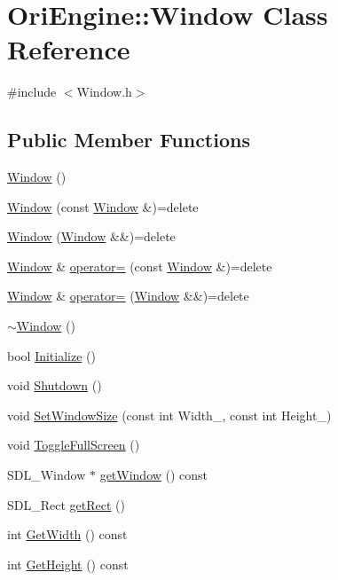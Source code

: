 \hypertarget{class_ori_engine_1_1_window}{}\section{Ori\+Engine\+:\+:Window Class Reference}
\label{class_ori_engine_1_1_window}


{\ttfamily \#include $<$Window.\+h$>$}

\subsection*{Public Member Functions}
\begin{DoxyCompactItemize}
\item 
\hyperlink{class_ori_engine_1_1_window_a74e6087da23d3c24e9fac0245e5ec92c}{Window} ()
\item 
\hyperlink{class_ori_engine_1_1_window_a16f73e151437c63953a6396aa80b686f}{Window} (const \hyperlink{class_ori_engine_1_1_window}{Window} \&)=delete
\item 
\hyperlink{class_ori_engine_1_1_window_acda5b9ba9a89a8bd8df298c1cedb71a8}{Window} (\hyperlink{class_ori_engine_1_1_window}{Window} \&\&)=delete
\item 
\hyperlink{class_ori_engine_1_1_window}{Window} \& \hyperlink{class_ori_engine_1_1_window_aad30c448f70cb9f20641289765e23350}{operator=} (const \hyperlink{class_ori_engine_1_1_window}{Window} \&)=delete
\item 
\hyperlink{class_ori_engine_1_1_window}{Window} \& \hyperlink{class_ori_engine_1_1_window_a54a09c75fc36036859b93c276ca834fa}{operator=} (\hyperlink{class_ori_engine_1_1_window}{Window} \&\&)=delete
\item 
\hyperlink{class_ori_engine_1_1_window_a245d821e6016fa1f6970ccbbedd635f6}{$\sim$\+Window} ()
\item 
bool \hyperlink{class_ori_engine_1_1_window_a41cab6dae60380563b8bc593e87f0c87}{Initialize} ()
\item 
void \hyperlink{class_ori_engine_1_1_window_a89c434ec340b4594c6c8af3f0bf58c9b}{Shutdown} ()
\item 
void \hyperlink{class_ori_engine_1_1_window_a21db050c674219f29a985694739ff31e}{Set\+Window\+Size} (const int Width\+\_\+, const int Height\+\_\+)
\item 
void \hyperlink{class_ori_engine_1_1_window_a65149d93f9842363f53bdc3e07f459a6}{Toggle\+Full\+Screen} ()
\item 
S\+D\+L\+\_\+\+Window $\ast$ \hyperlink{class_ori_engine_1_1_window_acf146679abf09abf89941b1882fc92dc}{get\+Window} () const
\item 
S\+D\+L\+\_\+\+Rect \hyperlink{class_ori_engine_1_1_window_a53ff5d3c56b28604d41b676bfdbf5129}{get\+Rect} ()
\item 
int \hyperlink{class_ori_engine_1_1_window_a451bdfeab37afce97712f23f5c2492aa}{Get\+Width} () const
\item 
int \hyperlink{class_ori_engine_1_1_window_a2196b5ae099037272cc85b223e80bd6d}{Get\+Height} () const
\end{DoxyCompactItemize}
